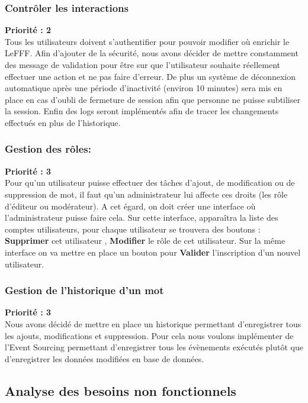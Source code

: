 \documentclass[12pt,a4paper]{article}
\begin{document}
\subsubsection{Contrôler les interactions }
 \textbf{Priorité : 2}
\\ Tous les utilisateurs doivent s'authentifier pour pouvoir modifier où enrichir le LeFFF. Afin d'ajouter de la sécurité, nous avons décider de mettre constamment des message de validation pour être sur que l'utilisateur souhaite réellement effectuer une action et ne pas faire d'erreur.
De plus un système de déconnexion automatique après une période d'inactivité (environ 10 minutes) sera mis en place en cas d'oubli de fermeture de session afin que personne ne puisse subtiliser la session.
Enfin des logs seront implémentés afin de tracer les changements effectués en plus de l'historique.

\subsubsection{Gestion des rôles:}
 \textbf{Priorité : 3} \\
Pour qu'un utilisateur puisse effectuer des tâches d'ajout, de modification ou de suppression de mot, il faut qu'un administrateur lui affecte ces droits (les rôle d'éditeur ou modérateur). A cet égard, on doit créer une interface où l'administrateur puisse faire cela.
Sur cette interface, apparaîtra la liste des comptes utilisateurs, pour chaque utilisateur se trouvera des boutons  : \textbf{Supprimer} cet utilisateur ,\textbf{ Modifier} le rôle de cet utilisateur. 
Sur la même interface on va mettre en place un bouton pour \textbf{Valider} l'inscription d'un nouvel utilisateur.


\subsubsection{Gestion de l'historique d'un mot}
 \textbf{Priorité : 3} \\
Nous avons décidé de mettre en place un historique permettant d'enregistrer tous les ajouts, modifications et suppression. Pour cela nous voulons implémenter de l'Event Sourcing permettant d'enregistrer tous les évènements exécutés plutôt que d'enregistrer les données modifiées en base de données.
\subsection{Analyse des besoins non fonctionnels}
\smallbreak
\end{document}
